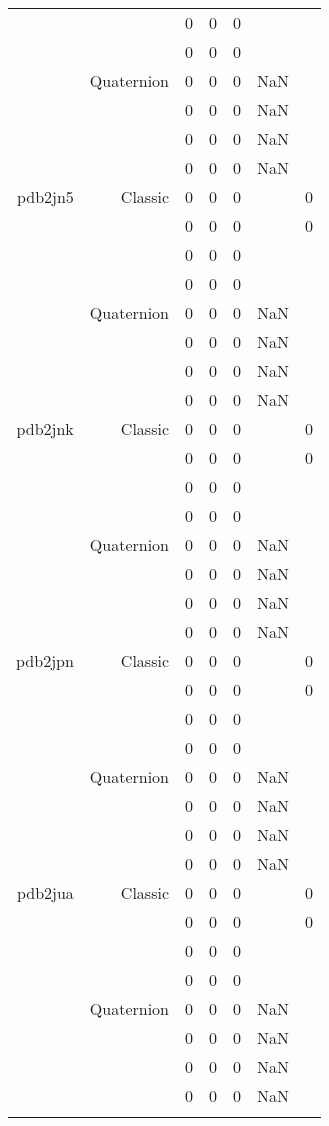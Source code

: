 \begin{xltabular}{\textwidth}{r|rcccSc}
& & 0 & 0 & 0 & & \\
& & 0 & 0 & 0 & & \\
& Quaternion & 0 & 0 & 0 & NaN & \\
& & 0 & 0 & 0 & NaN & \\
& & 0 & 0 & 0 & NaN & \\
& & 0 & 0 & 0 & NaN & \\ \addlinespace
pdb2jn5 & Classic & 0 & 0 & 0 & & 0 \\
& & 0 & 0 & 0 & & 0 \\
& & 0 & 0 & 0 & & \\
& & 0 & 0 & 0 & & \\
& Quaternion & 0 & 0 & 0 & NaN & \\
& & 0 & 0 & 0 & NaN & \\
& & 0 & 0 & 0 & NaN & \\
& & 0 & 0 & 0 & NaN & \\ \addlinespace
pdb2jnk & Classic & 0 & 0 & 0 & & 0 \\
& & 0 & 0 & 0 & & 0 \\
& & 0 & 0 & 0 & & \\
& & 0 & 0 & 0 & & \\
& Quaternion & 0 & 0 & 0 & NaN & \\
& & 0 & 0 & 0 & NaN & \\
& & 0 & 0 & 0 & NaN & \\
& & 0 & 0 & 0 & NaN & \\ \addlinespace
pdb2jpn & Classic & 0 & 0 & 0 & & 0 \\
& & 0 & 0 & 0 & & 0 \\
& & 0 & 0 & 0 & & \\
& & 0 & 0 & 0 & & \\
& Quaternion & 0 & 0 & 0 & NaN & \\
& & 0 & 0 & 0 & NaN & \\
& & 0 & 0 & 0 & NaN & \\
& & 0 & 0 & 0 & NaN & \\ \addlinespace
pdb2jua & Classic & 0 & 0 & 0 & & 0 \\
& & 0 & 0 & 0 & & 0 \\
& & 0 & 0 & 0 & & \\
& & 0 & 0 & 0 & & \\
& Quaternion & 0 & 0 & 0 & NaN & \\
& & 0 & 0 & 0 & NaN & \\
& & 0 & 0 & 0 & NaN & \\
& & 0 & 0 & 0 & NaN & \\ \addlinespace

\end{xltabular}
